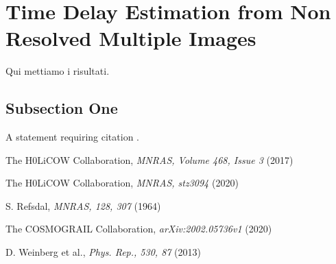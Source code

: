 \documentclass[twoside,twocolumn]{article}
\begin{document}
\section{Time Delay Estimation from Non Resolved Multiple Images}

Qui mettiamo i risultati.

\subsection{Subsection One}

A statement requiring citation \cite{Figueredo:2009dg}.



\begin{thebibliography}{99} %

The H0LiCOW Collaboration,
\textit{MNRAS, Volume 468, Issue 3} (2017)

The H0LiCOW Collaboration,
\textit{MNRAS, stz3094} (2020)

S. Refsdal,
\textit{MNRAS, 128, 307} (1964)

The COSMOGRAIL Collaboration,
\textit{arXiv:2002.05736v1} (2020)

D. Weinberg et al.,
\textit{Phys. Rep., 530, 87} (2013)

\end{thebibliography}

\end{document}
